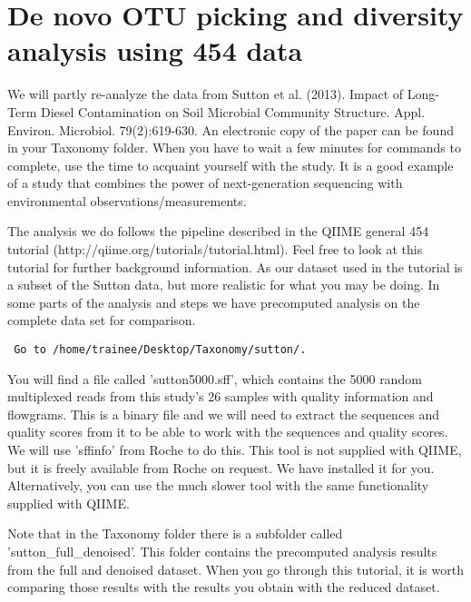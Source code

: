 \documentclass[a4paper,12pt,twoside]{memoir}
\begin{document}
\newpage

\section{De novo OTU picking and diversity analysis using 454 data}

\begin{information}
We will partly re-analyze the data from Sutton et al. (2013). Impact of Long-Term Diesel Contamination on Soil Microbial Community Structure. Appl. Environ. Microbiol. 79(2):619-630. An electronic copy of the paper can be found in your Taxonomy folder. When you have to wait a few minutes for commands to complete, use the time to acquaint yourself with the study. It is a good example of a study that combines the power of next-generation sequencing with environmental observations/measurements.

The analysis we do follows the pipeline described in the QIIME general 454 tutorial (http://qiime.org/tutorials/tutorial.html). Feel free to look at this tutorial for further background information. As our dataset  used in the tutorial is a subset of the Sutton data, but more realistic for what you may be doing. In some parts of the analysis and steps we have precomputed analysis on the complete data set for comparison.
\end{information}

\begin{steps}
 \begin{lstlisting}
 Go to /home/trainee/Desktop/Taxonomy/sutton/. 
 \end{lstlisting}
\end{steps}

\begin{note}
You will find a file called 'sutton5000.sff', which contains the 5000 random multiplexed reads from this study's 26 samples with quality information and flowgrams. This is a binary file and we will need to extract the sequences and quality scores from it to be able to work with the sequences and quality scores. We will use 'sffinfo' from Roche to do this. This tool is not supplied with QIIME, but it is freely available from Roche on request. We have installed it for you. Alternatively, you can use the much slower tool with the same functionality supplied with QIIME. 

Note that in the Taxonomy folder there is a subfolder called 'sutton\_full\_denoised'. This folder contains the precomputed analysis results from the full and denoised dataset. When you go through this tutorial, it is worth comparing those results with the results you obtain with the reduced dataset. 
\end{note}
\end{document}
